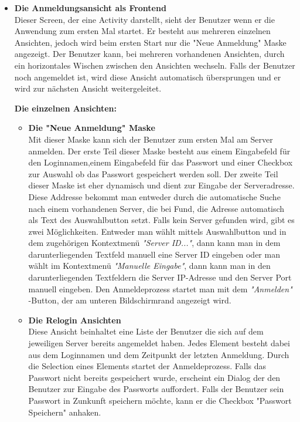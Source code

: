 \begin{itemize}
\item{\textbf{Die Anmeldungsansicht als Frontend}}\\
Dieser Screen, der eine Activity darstellt, sieht der Benutzer wenn er die Anwendung zum ersten Mal startet. Er besteht aus mehreren einzelnen Ansichten, jedoch wird beim ersten Start nur die "Neue Anmeldung" Maske angezeigt. Der Benutzer kann, bei mehreren vorhandenen Ansichten, durch ein horizontales Wischen zwischen den Ansichten wechseln. 
Falls der Benutzer noch angemeldet ist, wird diese Ansicht automatisch  übersprungen und er wird zur nächsten Ansicht weitergeleitet.

\textbf{Die einzelnen Ansichten:}
\begin{itemize}
\item{\textbf{Die "Neue Anmeldung" Maske}} \\
Mit dieser Maske kann sich der Benutzer zum ersten Mal am Server anmelden. Der erste Teil dieser Maske besteht aus einem Eingabefeld für den Loginnamen,einem Eingabefeld für das Passwort und einer Checkbox  zur Auswahl ob das Passwort gespeichert werden soll.
Der zweite Teil dieser Maske ist eher dynamisch und dient zur Eingabe der Serveradresse. Diese Addresse bekommt man entweder durch die automatische Suche nach einem vorhandenen Server, die bei Fund, die Adresse automatisch als Text des Auswahlbutton setzt. Falls kein Server gefunden wird, gibt es zwei Möglichkeiten.
Entweder man wählt mittels Auswahlbutton und in dem zugehörigen Kontextmenü \textit{"Server ID..."}, dann kann man in dem darunterliegenden Textfeld manuell eine Server ID eingeben oder man wählt im Kontextmenü \textit{"Manuelle Eingabe"}, dann kann man in den darunterliegenden Textfeldern die Server IP-Adresse und den Server Port manuell eingeben.
Den Anmeldeprozess startet man mit dem \textit{"Anmelden"} -Button, der am unteren Bildschirmrand angezeigt wird.

\item{\textbf{Die Relogin Ansichten}}\\
Diese Ansicht beinhaltet eine Liste der Benutzer die sich auf dem jeweiligen Server bereits angemeldet haben. Jedes Element besteht dabei aus dem Loginnamen und dem Zeitpunkt der letzten Anmeldung. Durch die Selection eines Elements startet der Anmeldeprozess. Falls das Passwort nicht bereits gespeichert wurde, erscheint ein Dialog der den Benutzer zur Eingabe des Passworts auffordert. Falls der Benutzer sein Passwort in Zunkunft speichern möchte, kann er die Checkbox "Passwort Speichern" anhaken.


\end{itemize}
\end{itemize}
